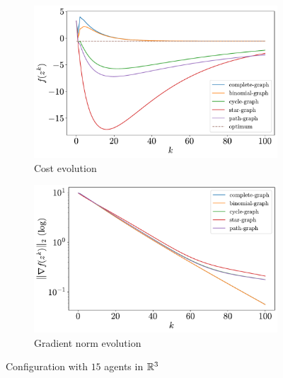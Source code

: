 \documentclass[a4paper,11pt,oneside]{book}
\begin{document}
\begin{figure}[ht]
      \centering
      \begin{subfigure}[t]{0.49\textwidth}
            \centering
            \includegraphics[width=\linewidth]{./figs/quadratic/cost_15_3_100.pdf} 
            \caption{Cost evolution}
      \end{subfigure}
      \hfill
      \begin{subfigure}[t]{0.49\textwidth}
            \centering
            \includegraphics[width=\linewidth]{./figs/quadratic/gradient_15_3_100.pdf} 
            \caption{Gradient norm evolution}
      \end{subfigure}
      \caption{Configuration with $15$ agents in ${\mathbb{R}}^{3}$}
      \label{fig:quadratic_15_3}
\end{figure}
\end{document}
